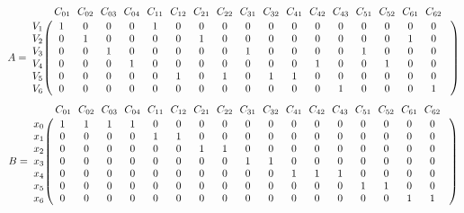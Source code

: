 \documentclass{article}
\begin{document}
\begin{figure}[h]
\end{figure}
$$
 A =
\bordermatrix{ & C_{01} \!&\! C_{02} \!&\! C_{03} \!&\! C_{04} \!&\! C_{11} \!&\! C_{12} \!&\! C_{21} \!&\! C_{22} \!&\! C_{31} \!&\! C_{32} \!&\! C_{41} \!&\! C_{42} \!&\! C_{43} \!&\! C_{51} \!&\! C_{52} \!&\! C_{61} \!&\! C_{62} \!&\! \cr 
V_{1} \!&\! 1 \!&\! 0 \!&\! 0 \!&\! 0 \!&\! 1 \!&\! 0 \!&\! 0 \!&\! 0 \!&\! 0 \!&\! 0 \!&\! 0 \!&\! 0 \!&\! 0 \!&\! 0 \!&\! 0 \!&\! 0 \!&\! 0 \!&\! \cr
V_{2} \!&\! 0 \!&\! 1 \!&\! 0 \!&\! 0 \!&\! 0 \!&\! 0 \!&\! 1 \!&\! 0 \!&\! 0 \!&\! 0 \!&\! 0 \!&\! 0 \!&\! 0 \!&\! 0 \!&\! 0 \!&\! 1 \!&\! 0 \!&\! \cr
V_{3} \!&\! 0 \!&\! 0 \!&\! 1 \!&\! 0 \!&\! 0 \!&\! 0 \!&\! 0 \!&\! 0 \!&\! 1 \!&\! 0 \!&\! 0 \!&\! 0 \!&\! 0 \!&\! 1 \!&\! 0 \!&\! 0 \!&\! 0 \!&\! \cr
V_{4} \!&\! 0 \!&\! 0 \!&\! 0 \!&\! 1 \!&\! 0 \!&\! 0 \!&\! 0 \!&\! 0 \!&\! 0 \!&\! 0 \!&\! 0 \!&\! 1 \!&\! 0 \!&\! 0 \!&\! 1 \!&\! 0 \!&\! 0 \!&\! \cr
V_{5} \!&\! 0 \!&\! 0 \!&\! 0 \!&\! 0 \!&\! 0 \!&\! 1 \!&\! 0 \!&\! 1 \!&\! 0 \!&\! 1 \!&\! 1 \!&\! 0 \!&\! 0 \!&\! 0 \!&\! 0 \!&\! 0 \!&\! 0 \!&\! \cr
V_{6} \!&\! 0 \!&\! 0 \!&\! 0 \!&\! 0 \!&\! 0 \!&\! 0 \!&\! 0 \!&\! 0 \!&\! 0 \!&\! 0 \!&\! 0 \!&\! 0 \!&\! 1 \!&\! 0 \!&\! 0 \!&\! 0 \!&\! 1 \!&\! \cr
}$$
$$
B =
\bordermatrix{ & C_{01} \!&\! C_{02} \!&\! C_{03} \!&\! C_{04} \!&\! C_{11} \!&\! C_{12} \!&\! C_{21} \!&\! C_{22} \!&\! C_{31} \!&\! C_{32} \!&\! C_{41} \!&\! C_{42} \!&\! C_{43} \!&\! C_{51} \!&\! C_{52} \!&\! C_{61} \!&\! C_{62} \!&\! \cr 
x_{0} \!&\! 1 \!&\! 1 \!&\! 1 \!&\! 1 \!&\! 0 \!&\! 0 \!&\! 0 \!&\! 0 \!&\! 0 \!&\! 0 \!&\! 0 \!&\! 0 \!&\! 0 \!&\! 0 \!&\! 0 \!&\! 0 \!&\! 0 \!&\! \cr
x_{1} \!&\! 0 \!&\! 0 \!&\! 0 \!&\! 0 \!&\! 1 \!&\! 1 \!&\! 0 \!&\! 0 \!&\! 0 \!&\! 0 \!&\! 0 \!&\! 0 \!&\! 0 \!&\! 0 \!&\! 0 \!&\! 0 \!&\! 0 \!&\! \cr
x_{2} \!&\! 0 \!&\! 0 \!&\! 0 \!&\! 0 \!&\! 0 \!&\! 0 \!&\! 1 \!&\! 1 \!&\! 0 \!&\! 0 \!&\! 0 \!&\! 0 \!&\! 0 \!&\! 0 \!&\! 0 \!&\! 0 \!&\! 0 \!&\! \cr
x_{3} \!&\! 0 \!&\! 0 \!&\! 0 \!&\! 0 \!&\! 0 \!&\! 0 \!&\! 0 \!&\! 0 \!&\! 1 \!&\! 1 \!&\! 0 \!&\! 0 \!&\! 0 \!&\! 0 \!&\! 0 \!&\! 0 \!&\! 0 \!&\! \cr
x_{4} \!&\! 0 \!&\! 0 \!&\! 0 \!&\! 0 \!&\! 0 \!&\! 0 \!&\! 0 \!&\! 0 \!&\! 0 \!&\! 0 \!&\! 1 \!&\! 1 \!&\! 1 \!&\! 0 \!&\! 0 \!&\! 0 \!&\! 0 \!&\! \cr
x_{5} \!&\! 0 \!&\! 0 \!&\! 0 \!&\! 0 \!&\! 0 \!&\! 0 \!&\! 0 \!&\! 0 \!&\! 0 \!&\! 0 \!&\! 0 \!&\! 0 \!&\! 0 \!&\! 1 \!&\! 1 \!&\! 0 \!&\! 0 \!&\! \cr
x_{6} \!&\! 0 \!&\! 0 \!&\! 0 \!&\! 0 \!&\! 0 \!&\! 0 \!&\! 0 \!&\! 0 \!&\! 0 \!&\! 0 \!&\! 0 \!&\! 0 \!&\! 0 \!&\! 0 \!&\! 0 \!&\! 1 \!&\! 1 \!&\! \cr
}$$
\end{document}
